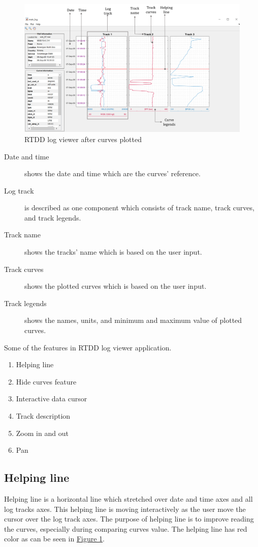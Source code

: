\documentclass[12pt,a4paper,oneside]{report}
\begin{document}
\begin{figure}[ht]
\centering
\includegraphics[width=\textwidth]{win_w_curves.png}
\caption{RTDD log viewer after curves plotted}
\label{fig:win_w_curves}
\end{figure}

\begin{description}
\item[Date and time] shows the date and time which are the curves' reference.
\item[Log track] is described as one component which consists of track name, track curves, and track legends.
\item[Track name] shows the tracks' name which is based on the user input.
\item[Track curves] shows the plotted curves which is based on the user input.
\item[Track legends] shows the names, units, and minimum and maximum value of plotted curves.
\end{description}

\noindent Some of the features in RTDD log viewer application.
\begin{enumerate}
\setlength\itemsep{0.1em}
\item{Helping line}
\item{Hide curves feature}
\item{Interactive data cursor}
\item{Track description}
\item{Zoom in and out}
\item{Pan}
\end{enumerate}

\subsection{Helping line}
Helping line is a horizontal line which stretched over date and time axes and all log tracks axes. This helping line is moving interactively as the user move the cursor over the log track axes. The purpose of helping line is to improve reading the curves, especially during comparing curves value. The helping line has red color as can be seen in \hyperref[fig:win_w_curves]{Figure \ref{fig:win_w_curves}}.
\end{document}
